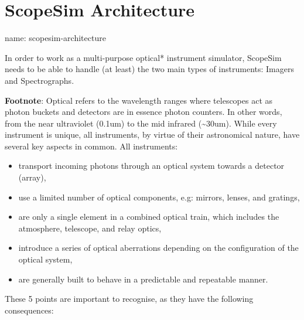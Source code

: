 

\section{ScopeSim Architecture%
  \label{scopesim-architecture}%
}

\begin{DUfieldlist}
\item[{name:}]
scopesim-architecture
\end{DUfieldlist}

In order to work as a multi-purpose optical* instrument simulator, ScopeSim needs to be able to handle (at least) the two main types of instruments: Imagers and Spectrographs.

\textbf{Footnote}: Optical refers to the wavelength ranges where telescopes act as \textquotedbl{}photon buckets\textquotedbl{} and detectors are in essence \textquotedbl{}photon counters\textquotedbl{}.
In other words, from the near ultraviolet (0.1um) to the mid infrared (\textasciitilde{}30um).
While every instrument is unique, all instruments, by virtue of their astronomical nature, have several key aspects in common.
All instruments:

\begin{itemize}
\item transport incoming photons through an optical system towards a detector (array),

\item use a limited number of optical components, e.g: mirrors, lenses, and gratings,

\item are only a single element in a combined optical train, which includes the atmosphere, telescope, and relay optics,

\item introduce a series of optical aberrations depending on the configuration of the optical system,

\item are generally built to behave in a predictable and repeatable manner.
\end{itemize}

These 5 points are important to recognise, as they have the following consequences:

